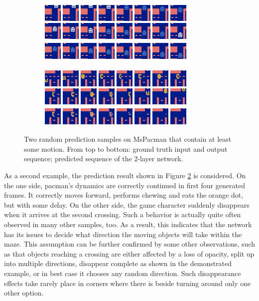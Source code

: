 \begin{figure}[h!tb]
\centering
\begin{subfigure}{0.49\textwidth}
  \centering
  \includegraphics[width=0.92\linewidth]{figures/pred/pac/random/pred-00.png}
  \caption{}
  \label{fig:pac-pred-random1}
\end{subfigure}%
\begin{subfigure}{0.49\textwidth}
  \centering
  \includegraphics[width=0.92\linewidth]{figures/pred/pac/random/pred-04.png}
  \caption{}
  \label{fig:pac-pred-random2}
\end{subfigure}
\caption[Random Prediction Samples on MsPacman]{Two random prediction samples on MsPacman that contain at least some motion. From top to bottom: ground truth input and output sequence; predicted sequence of the 2-layer network.} \label{fig:pac-pred-random}
\end{figure}

As a second example, the prediction result shown in Figure \ref{fig:pac-pred-random2} is considered. On the one side, pacman's dynamics are correctly continued in first four generated frames. It correctly moves forward, performs chewing and eats the orange dot, but with some delay. On the other side, the game character suddenly disappears when it arrives at the second crossing. Such a behavior is actually quite often observed in many other samples, too. As a result, this indicates that the network has its issues to decide what direction the moving objects will take within the maze. This assumption can be further confirmed by some other observations, such as that objects reaching a crossing are either affected by a loss of opacity, split up into multiple directions, disappear complete as shown in the demonstrated example, or in best case it chooses any random direction. Such disappearance effects take rarely place in corners where there is beside turning around only one other option.

